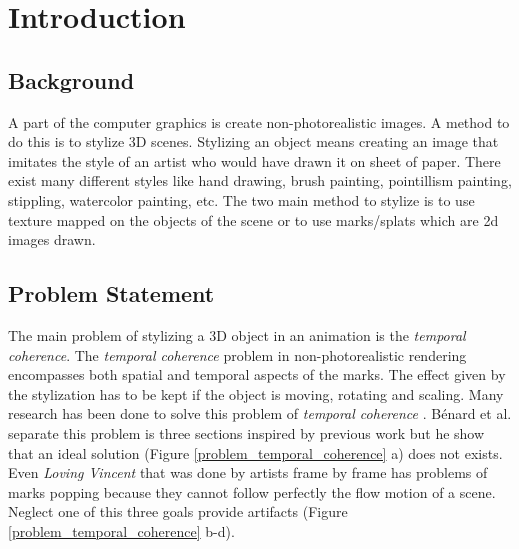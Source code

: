 \chapter{Introduction}


\section{Background}
A part of the computer graphics is create non-photorealistic images. A method to do this is to stylize 3D scenes. Stylizing an object means creating an image that imitates the style of an artist who would have drawn it on sheet of paper. There exist many different styles like hand drawing, brush painting, pointillism painting, stippling, watercolor painting, etc. The two main method to stylize is to use texture mapped on the objects of the scene or to use marks/splats which are 2d images drawn.

\section{Problem Statement}


The main problem of stylizing a 3D object in an animation is the \textit{temporal coherence}. The \textit{temporal coherence} problem in non-photorealistic rendering encompasses both spatial and temporal aspects of the marks. The effect given by the stylization has to be kept if the object is moving, rotating and scaling. Many research has been done to solve this problem of \textit{temporal coherence} \cite{vergne_implicit_2011, benard_dynamic_2009, bleron_motion-coherent_2018}. Bénard et al. separate this problem is three sections inspired by previous work\cite{meier_painterly_1996, cunzi_dynamic_nodate, breslav_dynamic_nodate, benard_state---art_2011} but he show that an ideal solution (Figure \ref{problem_temporal_coherence} a)  does not exists. Even \textit{Loving Vincent} \cite{LovingVincent} that was done by artists frame by frame has problems of marks popping because they cannot follow perfectly the flow motion of a scene. Neglect one of this three goals provide artifacts (Figure \ref{problem_temporal_coherence} b-d).

